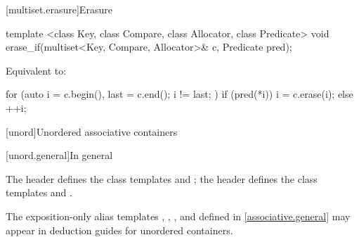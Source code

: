 [multiset.erasure]{Erasure}

%
\begin{itemdecl}
template <class Key, class Compare, class Allocator, class Predicate>
  void erase_if(multiset<Key, Compare, Allocator>& c, Predicate pred);
\end{itemdecl}

\begin{itemdescr}
\pnum
\effects
Equivalent to:
\begin{codeblock}
for (auto i = c.begin(), last = c.end(); i != last; ) {
  if (pred(*i)) {
    i = c.erase(i);
  } else {
    ++i;
  }
}
\end{codeblock}
\end{itemdescr}

[unord]{Unordered associative containers}

[unord.general]{In general}

\pnum
The header  defines the class templates
 and
; the header  defines the class templates
 and .

\pnum
The exposition-only alias templates ,
, , and 
defined in \ref{associative.general} may appear in deduction guides for unordered containers.

